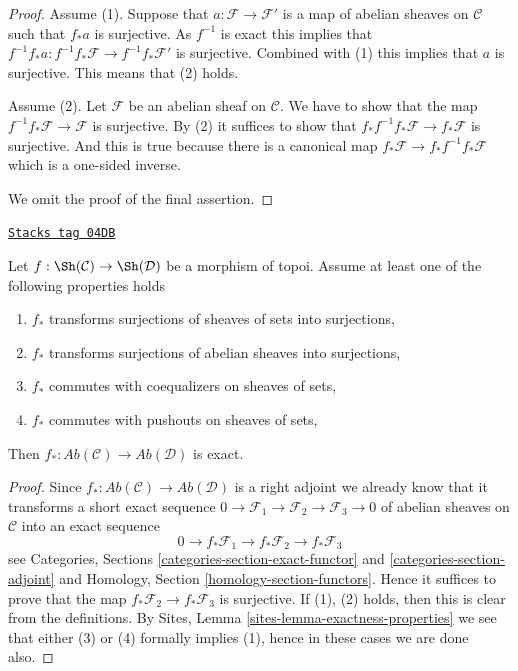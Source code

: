 \begin{proof}
Assume (1). Suppose that $a : \mathcal{F} \to \mathcal{F}'$
is a map of abelian sheaves on $\mathcal{C}$ such that $f_*a$ is surjective.
As $f^{-1}$ is exact this implies that
$f^{-1}f_*a : f^{-1}f_*\mathcal{F} \to f^{-1}f_*\mathcal{F}'$
is surjective. Combined with (1) this implies that $a$ is surjective.
This means that (2) holds.

\medskip\noindent
Assume (2). Let $\mathcal{F}$ be an abelian sheaf on $\mathcal{C}$.
We have to show that the map $f^{-1}f_*\mathcal{F} \to \mathcal{F}$ is
surjective. By (2) it suffices to show that
$f_*f^{-1}f_*\mathcal{F} \to f_*\mathcal{F}$ is surjective.
And this is true because there is a canonical map
$f_*\mathcal{F} \to f_*f^{-1}f_*\mathcal{F}$ which is a one-sided inverse.

\medskip\noindent
We omit the proof of the final assertion.
\end{proof}

\begin{lemma}[Exactness]
\label{sites-modules-lemma-exactness}
\href{https://stacks.math.columbia.edu/tag/04DB}{\texttt{Stacks tag 04DB}}

Let $f : \Sh(\mathcal{C}) \to \Sh(\mathcal{D})$ be
a morphism of topoi. Assume at least one of the following properties
holds
\begin{enumerate}
\item $f_*$ transforms surjections of sheaves of sets into surjections,
\item $f_*$ transforms surjections of abelian sheaves into surjections,
\item $f_*$ commutes with coequalizers on sheaves of sets,
\item $f_*$ commutes with pushouts on sheaves of sets,
\end{enumerate}
Then $f_* : \textit{Ab}(\mathcal{C}) \to \textit{Ab}(\mathcal{D})$
is exact.
\end{lemma}

\begin{proof}
Since $f_* : \textit{Ab}(\mathcal{C}) \to \textit{Ab}(\mathcal{D})$
is a right adjoint we already know that it transforms a short exact sequence
$0 \to \mathcal{F}_1 \to \mathcal{F}_2 \to \mathcal{F}_3 \to 0$
of abelian sheaves on $\mathcal{C}$ into an exact sequence
$$
0 \to f_*\mathcal{F}_1 \to f_*\mathcal{F}_2 \to f_*\mathcal{F}_3
$$
see
Categories, Sections \ref{categories-section-exact-functor} and
\ref{categories-section-adjoint}
and
Homology, Section \ref{homology-section-functors}. Hence it suffices to
prove that the map $f_*\mathcal{F}_2 \to f_*\mathcal{F}_3$ is surjective.
If (1), (2) holds, then this is clear from the definitions. By
Sites, Lemma \ref{sites-lemma-exactness-properties}
we see that either (3) or (4) formally implies (1), hence in these cases
we are done also.
\end{proof}

